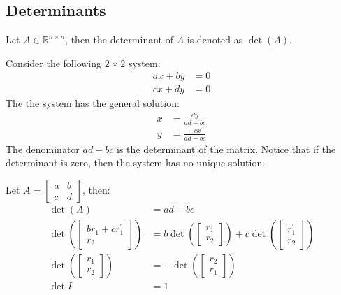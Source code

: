 \documentclass[11pt]{article}
\begin{document}
\subsection{Determinants}
\begin{definition}[Determinant]
    Let $A \in \mathbb{R}^{n \times n}$, then the determinant of $A$ is denoted as $\det(A)$.
\end{definition}
\begin{example}
    Consider the following $2\times 2$ system:
    \begin{align*}
        ax + by &= 0 \\
        cx + dy &= 0
    \end{align*}
    The the system has the general solution:
    \begin{align*}
        x &= \frac{dy}{ad - bc} \\
        y &= \frac{-cx}{ad - bc}
    \end{align*}
    The denominator $ad - bc$ is the determinant of the matrix. Notice that if the determinant is zero, then the system has no unique solution.
\end{example}
\begin{theorem}
    Let $A = \begin{bmatrix} a & b \\ c & d \end{bmatrix}$, then:
    \begin{align}
        \det(A) &= ad - bc \\
        \det\left(\begin{bmatrix}
            br_1 + cr_1^\prime \\ r_2
        \end{bmatrix}\right) &= b\det\left(\begin{bmatrix}
            r_1 \\ r_2
        \end{bmatrix}\right) + c\det\left(\begin{bmatrix}
            r_1^\prime \\ r_2 
        \end{bmatrix}\right) \\
        \det\left(\begin{bmatrix}
            r_1 \\ r_2
        \end{bmatrix}\right) &= -\det\left(\begin{bmatrix}
            r_2 \\ r_1
        \end{bmatrix}\right) \\ 
        \det I &= 1
\end{align}
\end{theorem}
\end{document}
